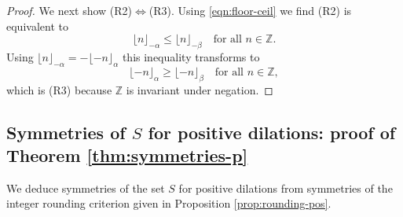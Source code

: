 \documentclass[11pt, letterpaper, reqno]{amsart}
\theoremstyle{definition}
\numberwithin{equation}{section}
\newcommand{\ZZ}{\ensuremath{\mathbb{Z}}}
\newcommand{\floor}[1]{\lfloor{#1}\rfloor}
\begin{document}
\begin{proof}
We next show (R2)$\Leftrightarrow$(R3). Using \eqref{eqn:floor-ceil} we find (R2) is equivalent 
to 
\begin{equation}\label{eqn:sign-floor}
\floor{n}_{-\alpha} \le \floor{n}_{-\beta} \quad\text{for all $n \in \ZZ$}.
\end{equation}
Using $\floor{n}_{-\alpha}= -\floor{-n}_{\alpha}$ this inequality transforms to
$$
\floor{-n}_{\alpha} \ge \floor{-n}_{\beta} \quad\text{for all $n \in \ZZ$},
$$
which is (R3) 
because $\ZZ$ is  invariant under negation.
\end{proof}


%
%
\subsection{Symmetries of $S$ for positive dilations: proof of Theorem \ref{thm:symmetries-p}} 
\label{subsec:symmetries-pos}

We  deduce symmetries of the set $S$ for positive dilations from symmetries of
the integer rounding criterion given in  Proposition \ref{prop:rounding-pos}. 
\end{document}
